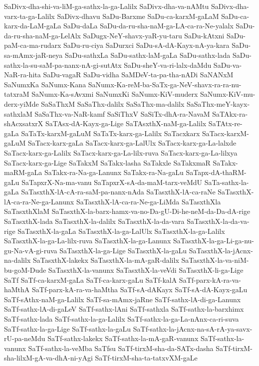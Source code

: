 {SaDivx-dha-shi-va-liM-ga-sathx-la-ga-Lalilx
SaDivx-dha-va-nAMtu
SaDivx-dha-varx-ta-ga-Lalilx
SaDivx-dhavu
SaDu-Barxme
SaDu-ca-karxM-gaLaM
SaDu-ca-karx-da-LaM-gaLa
SaDu-daLa
SaDu-da-ru-sha-naM-ga-LA-ca-ra-Ne-yalalx
SaDu-da-ru-sha-naM-ga-LelAlx
SaDugx-NeY-shavx-yaR-yu-taru
SaDu-kAtxni
SaDu-paM-ca-ma-rudarx
SaDu-ru-ciya
SaDurxci
SaDu-sA-dA-Kayx-nA-ya-kara
SaDu-sa-mAmx-jaR-neya
SaDu-sathxLa
SaDu-sathx-laM-gaLa
SaDu-sathx-lada
SaDu-sathx-la-su-saM-pa-nanx-nA-gi-sutAtx
SaDu-sheY-va-ri-lalx-daMdu
SaDu-va-NaR-ra-hita
SaDu-vagaR
SaDu-vidha
SaMDeV-ta-pa-tha-nADi
SaNANxM
SaNumxKa
SaNumx-Kana
SaNumx-Ka-reM-ba-SaTx-ga-NeV-shavx-ra-ra-nu-tatxraM
SaNumx-Ka-sAvxmi
SaNumxKi
SaNumx-KiV-muderx
SaNumx-KiV-mu-derx-yiMde
SaSaThxM
SaSaThx-dalilx
SaSaThx-ma-dalilx
SaSaThx-meY-kayx-sathxlaM
SaSaThx-va-NaR-kamf
SaSiThxV
SaSiTx-dhA-ra-NavaM
SaTAkx-ra-shAcxsatxrX
SaTAsx-dA-Kayx-ga-Lige
SaTAsxthX-naM-ga-Lalilx
SaTAtx-re-gaLa
SaTaTx-karxM-gaLuM
SaTaTx-karx-ga-Lalilx
SaTacxkarx
SaTacx-karxM-gaLuM
SaTacx-karx-gaLa
SaTacx-karx-ga-LalUlx
SaTacx-karx-ga-La-lalxde
SaTacx-karx-ga-Lalilx
SaTacx-karx-ga-La-lilx-ruva
SaTacx-karx-ga-La-lilxya
SaTacx-karx-ga-Lige
SaTakxM
SaTakx-lasha
SaTakxle
SaTakxmaR
SaTakx-maRM-gaLa
SaTakx-ra-Na-ga-Lanunx
SaTakx-ra-Na-gaLu
SaTapx-dA-thaRM-gaLu
SaTapxrX-Na-ma-vanu
SaTapxrX-sA-da-maM-tarx-veMdU
SaTa-sathx-la-gaLa
SaTasxthX-lA-cA-ra-saM-pa-nanx-nAda
SaTasxthX-lA-ca-raNe
SaTasxthX-lA-ca-ra-Ne-ga-Lanunx
SaTasxthX-lA-ca-ra-Ne-ga-LiMda
SaTasxthXla
SaTasxthXlaM
SaTasxthX-la-barx-hamx-va-no-Da-gU-Di-he-neM-da-Da-dA-rige
SaTasxthX-lada
SaTasxthX-la-dalilx
SaTasxthX-la-da-vara
SaTasxthX-la-da-va-rige
SaTasxthX-la-gaLa
SaTasxthX-la-ga-LalUlx
SaTasxthX-la-ga-Lalilx
SaTasxthX-la-ga-La-lilx-ruva
SaTasxthX-la-ga-Lanunx
SaTasxthX-la-ga-Li-ga-nu-gu-Na-vA-gi-ruva
SaTasxthX-la-ga-Lige
SaTasxthX-la-gaLu
SaTasxthX-la-jAcnx-na-dalilx
SaTasxthX-lakekx
SaTasxthX-la-mA-gaR-dalilx
SaTasxthX-la-va-niM-bu-goM-Dude
SaTasxthX-la-vanunx
SaTasxthX-la-veVdi
SaTasxthX-li-ga-Lige
SaTf
SaTf-ca-karxM-gaLa
SaTf-ca-karx-gaLu
SaTf-kalA
SaTf-parx-kA-ra-va-haMthA
SaTf-parx-kA-ra-va-haMtha
SaTf-sA-dAKayx
SaTf-sA-dA-Kayx-gaLu
SaTf-sAthx-naM-ga-Lalilx
SaTf-sa-mAmx-jaRne
SaTf-sathx-lA-di-ga-Lanunx
SaTf-sathx-lA-di-gaLeV
SaTf-sathx-lAni
SaTf-sathxla
SaTf-sathx-la-barxhimx
SaTf-sathx-lada
SaTf-sathx-la-ga-Lalilx
SaTf-sathx-la-ga-La-nAnx-ca-ri-suva
SaTf-sathx-la-ga-Lige
SaTf-sathx-la-gaLu
SaTf-sathx-la-jAcnx-na-sA-rA-ya-savx-rU-pa-neMdu
SaTf-sathx-lakekx
SaTf-sathx-la-mA-gaR-vanunx
SaTf-sathx-la-vanunx
SaTf-sathx-la-veMba
SaTfsu
SaTf-tirxM-sha-da-SATx-dasha
SaTf-tirxM-sha-lilxM-gA-va-dhA-ni-yAgi
SaTf-tirxM-sha-ta-tatxvXM-gaLe
}
